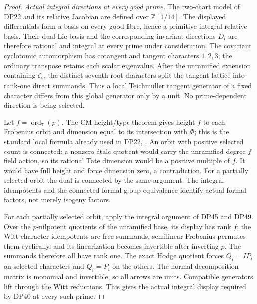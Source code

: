 \documentclass[11pt,a4paper]{article}
\theoremstyle{definition}\newtheorem{remark}[theorem]{Remark}
\newcommand{\Z}{\mathbb Z}\newcommand{\Q}{\mathbb Q}\newcommand{\F}{\mathbb F}
\begin{document}
\begin{proof}
\emph{Actual integral directions at every good prime.}
The two-chart model of DP22 and its relative Jacobian are defined over $\Z[1/14]$. The displayed differentials form a basis on every good fibre, hence a primitive integral relative basis. Their dual Lie basis and the corresponding invariant directions $D_i$ are therefore rational and integral at every prime under consideration.
The covariant cyclotomic automorphism has cotangent and tangent characters $1,2,3$; the ordinary transpose retains each scalar eigenvalue.
After the unramified extension containing $\zeta_7$, the distinct seventh-root characters split the tangent lattice into rank-one direct summands. Thus a local Teichm\"uller tangent generator of a fixed character differs from this global generator only by a unit. No prime-dependent direction is being selected.

Let $f=\operatorname{ord}_7(p)$. The CM height/type theorem gives height $f$ to each Frobenius orbit and dimension equal to its intersection with $\Phi$; this is the standard local formula already used in DP22, \cite[\S5, (10*) and Theorem 3, pp.~106--108]{Tate352}.
An orbit with positive selected count is connected: a nonzero \'etale quotient would carry the unramified degree-$f$ field action, so its rational Tate dimension would be a positive multiple of $f$. It would have full height and force dimension zero, a contradiction. For a partially selected orbit the dual is connected by the same argument.
The integral idempotents and the connected formal-group equivalence identify actual formal factors, not merely isogeny factors.

For each partially selected orbit, apply the integral argument of DP45 and DP49. Over the $p$-nilpotent quotients of the unramified base, its display has rank $f$; the Witt character idempotents are free summands, semilinear Frobenius permutes them cyclically, and its linearization becomes invertible after inverting $p$. The summands therefore all have rank one. The exact Hodge quotient forces $Q_i=IP_i$ on selected characters and $Q_i=P_i$ on the others. The normal-decomposition matrix is monomial and invertible, so all arrows are units. Compatible generators lift through the Witt reductions. This gives the actual integral display required by DP40 at every such prime.


\end{proof}
\end{document}
